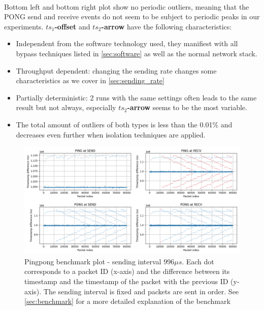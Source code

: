 \documentclass{article}
\begin{document}
\paragraph*{} Bottom left and bottom right plot show no periodic outliers, 
meaning that the PONG send and receive events do not seem to be subject to
periodic peaks in our experiments. \textbf{$ts_1$-offset} and 
\textbf{$ts_2$-arrow} have the following characteristics:

\begin{itemize}
  \item Independent from the software technology used, they manifiest with all 
  bypass techniques listed in \autoref{sec:software} as well as the normal 
  network stack. 
  \item Throughput dependent: changing the sending rate changes some 
  characteristics as we cover in \autoref{sec:sending_rate}
  \item Partially deterministic: 2 runs with the same settings often leads to 
  the same result but not always, especially \textbf{$ts_2$-arrow} seems to be
  the most variable. 
  \item The total amount of outliers of both types is less than the 0.01\% and
  decreases even further when isolation techniques are applied.
\end{itemize}



\begin{figure}
  \centering
  \includegraphics[width=\textwidth]{fig/xsk_80k_996us_powermax.png}
  \caption{Pingpong benchmark plot - sending interval $996\mu s$. Each dot corresponds 
  to a packet ID (x-axis) and the difference between its timestamp and the timestamp 
  of the packet with the previous ID (y-axis). The sending interval is fixed and 
  packets are sent in order. See \autoref{sec:benchmark} for a more detailed
  explanation of the benchmark}
  \label{fig:1}
\end{figure}
\end{document}
